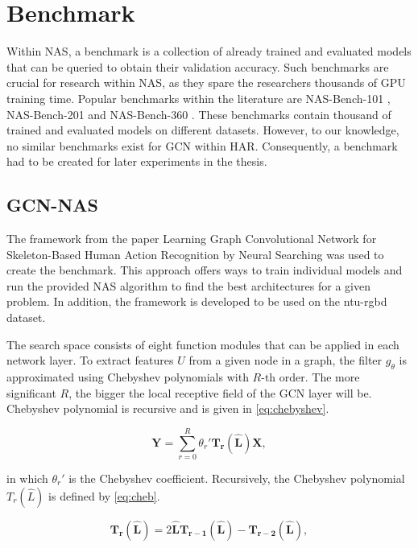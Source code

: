 \section{Benchmark}
Within \gls{NAS}, a benchmark is a collection of already trained and evaluated models that can be queried to obtain their validation accuracy. Such benchmarks are crucial for research within \gls{NAS}, as they spare the researchers thousands of \gls{GPU} training time. Popular benchmarks within the literature are NAS-Bench-101 \autocite{ying2019bench}, NAS-Bench-201 \autocite{dong2020bench} and NAS-Bench-360 \autocite{tu2021bench}. These benchmarks contain thousand of trained and evaluated models on different datasets. However, to our knowledge, no similar benchmarks exist for \gls{GCN} within \gls{HAR}. Consequently, a benchmark had to be created for later experiments in the thesis.      

\subsection{GCN-NAS}\label{sec:gcn-nas}
The framework from the paper Learning Graph Convolutional Network for Skeleton-Based Human Action Recognition by Neural Searching \autocite{peng2020learning} was used to create the benchmark. This approach offers ways to train individual models and run the provided \gls{NAS} algorithm to find the best architectures for a given problem. In addition, the framework is developed to be used on the \gls{ntu-rgbd} dataset.  

The search space consists of eight function modules that can be applied in each network layer. To extract features $U$ from a given node in a graph, the filter $g_{\theta}$ is approximated using Chebyshev polynomials with $R\text{-th}$ order. The more significant $R$, the bigger the local receptive field of the \gls{GCN} layer will be. Chebyshev polynomial is recursive and is given in \cref{eq:chebyshev}. 

\begin{equation}
    \bm{Y} = \sum^R_{r=0} \theta_r' \bm{T_r} (\bm{\hat{L}})\bm{X},
    \label{eq:chebyshev}
\end{equation}

in which $ \theta_r'$ is the Chebyshev coefficient. Recursively, the Chebyshev polynomial $T_r(\hat{L})$ is defined by \cref{eq:cheb}. 

\begin{equation}
    \bm{T_r}(\bm{\hat{L}}) = 2 \bm{\hat{L}}\bm{T_{r-1}} (\bm{\hat{L}}) - \bm{T_{r-2}}(\bm{\hat{L}}),
    \label{eq:cheb}
\end{equation}


